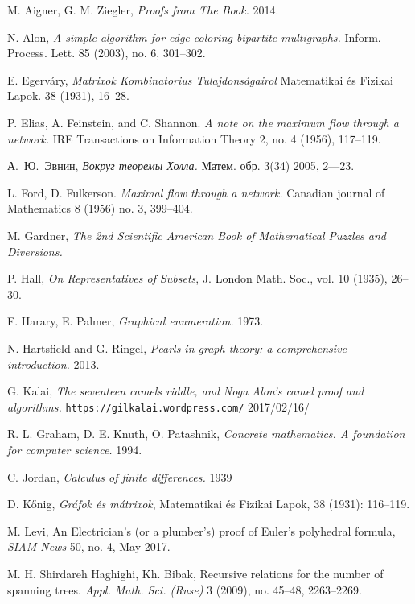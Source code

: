 \begin{thebibliography}{52}

 M. Aigner, G. M. Ziegler,  \emph{Proofs from The Book.} 2014.

 N. Alon,
\emph{A simple algorithm for edge-coloring bipartite multigraphs.}
Inform. Process. Lett. 85 (2003), no. 6, 301--302. 

E. Egerv\'ary, 
\emph{Matrixok Kombinatorius Tulajdons\'agairol}
Matematikai \'es Fizikai Lapok. 38 (1931), 16--28.

 P. Elias, A. Feinstein, and C. Shannon. 
\emph{A note on the maximum flow through a network.}
IRE Transactions on Information Theory 2, no. 4 (1956), 117--119.

 \begin{otherlanguage}{russian}
А.~Ю.~Эвнин,
\emph{Вокруг теоремы Холла.} Матем. обр. 3(34) 2005, 2---23.
 \end{otherlanguage}

 L. Ford, D. Fulkerson. 
\emph{Maximal flow through a network.} 
Canadian journal of Mathematics 8 (1956) no. 3, 399--404.

 M. Gardner, \emph{The 2nd Scientific American Book of Mathematical Puzzles and Diversions.}

P. Hall, \emph{On Representatives of Subsets}, J. London Math. Soc., vol. 10 (1935), 26--30.

 F. Harary, E. Palmer, \emph{Graphical enumeration.} 1973.

 N. Hartsfield and  G. Ringel, \emph{Pearls in graph theory: a comprehensive introduction.} 2013.

 G. Kalai, \emph{The seventeen camels riddle, and Noga Alon’s camel proof and algorithms.}
\texttt{https://gilkalai.wordpress.com/} 2017/02/16/

 R. L. Graham, D. E. Knuth, O. Patashnik, 
\emph{Concrete mathematics. A foundation for computer science.}  1994.

 C. Jordan, \emph{Calculus of finite differences.} 1939

 D. K\H{o}nig, \emph{Gr\'{a}fok \'{e}s m\'{a}trixok}, Matematikai és Fizikai Lapok, 38 (1931): 116--119.

 M. Levi,
An Electrician’s (or a plumber’s)
proof of Euler’s polyhedral formula,
\emph{SIAM News} 50, no. 4, May 2017.

 M. H. Shirdareh Haghighi, Kh. Bibak, 
Recursive relations for the number of spanning trees. 
\emph{Appl. Math. Sci. (Ruse)} 3 (2009), no. 45--48, 2263--2269.
\end{thebibliography}

